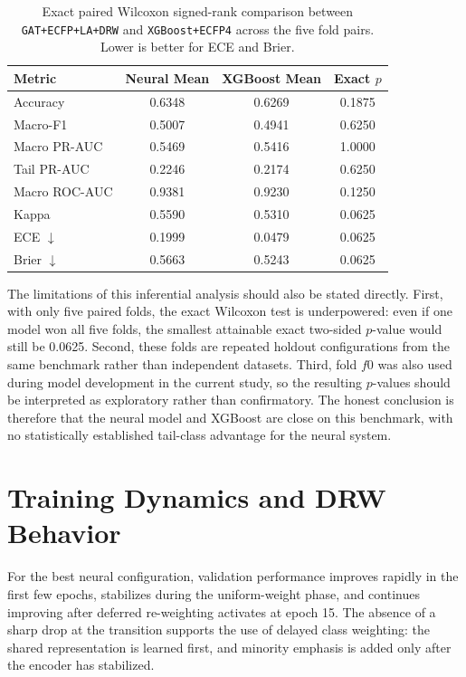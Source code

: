 \begin{table}[H]
\centering
\caption{Exact paired Wilcoxon signed-rank comparison between \texttt{GAT+ECFP+LA+DRW} and \texttt{XGBoost+ECFP4} across the five fold pairs. Lower is better for ECE and Brier.}
\label{tab:wilcoxon_xgb}
\begin{tabular}{lccc}
\toprule
Metric & Neural Mean & XGBoost Mean & Exact \(p\) \\
\midrule
Accuracy & 0.6348 & 0.6269 & 0.1875 \\
Macro-F1 & 0.5007 & 0.4941 & 0.6250 \\
Macro PR-AUC & 0.5469 & 0.5416 & 1.0000 \\
Tail PR-AUC & 0.2246 & 0.2174 & 0.6250 \\
Macro ROC-AUC & 0.9381 & 0.9230 & 0.1250 \\
Kappa & 0.5590 & 0.5310 & 0.0625 \\
ECE \(\downarrow\) & 0.1999 & 0.0479 & 0.0625 \\
Brier \(\downarrow\) & 0.5663 & 0.5243 & 0.0625 \\
\bottomrule
\end{tabular}
\end{table}

The limitations of this inferential analysis should also be stated directly. First, with only five paired folds, the exact Wilcoxon test is underpowered: even if one model won all five folds, the smallest attainable exact two-sided \(p\)-value would still be 0.0625. Second, these folds are repeated holdout configurations from the same benchmark rather than independent datasets. Third, fold \(f0\) was also used during model development in the current study, so the resulting \(p\)-values should be interpreted as exploratory rather than confirmatory. The honest conclusion is therefore that the neural model and XGBoost are close on this benchmark, with no statistically established tail-class advantage for the neural system.

\section{Training Dynamics and DRW Behavior}
For the best neural configuration, validation performance improves rapidly in the first few epochs, stabilizes during the uniform-weight phase, and continues improving after deferred re-weighting activates at epoch 15. The absence of a sharp drop at the transition supports the use of delayed class weighting: the shared representation is learned first, and minority emphasis is added only after the encoder has stabilized.

